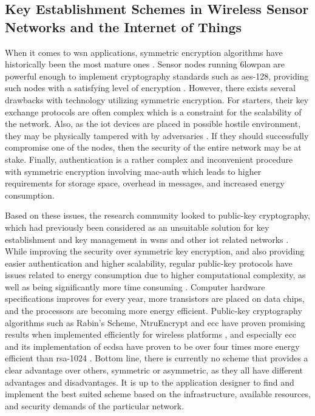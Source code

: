 

\subsection{Key Establishment Schemes in Wireless Sensor Networks and the Internet of Things}

When it comes to \gls{wsn} applications, symmetric encryption algorithms have historically been the most mature ones \citep{Jing2014}. Sensor nodes running \gls{6lowpan} are powerful enough to implement cryptography standards such as \gls{aes}-128, providing such nodes with a satisfying level of encryption \cite{Roman2011147}. However, there exists several drawbacks with technology utilizing symmetric encryption. For starters, their key exchange protocols are often complex which is a constraint for the scalability of the network. Also, as the \gls{iot} devices are placed in possible hostile environment, they may be physically tampered with by adversaries \cite{krentz20136lowpan}. If they should successfully compromise one of the nodes, then the security of the entire network may be at stake. Finally, authentication is a rather complex and inconvenient procedure with symmetric encryption involving \gls{mac-auth} which leads to higher requirements for storage space, overhead in messages, and increased energy consumption.

Based on these issues, the research community looked to public-key cryptography, which had previously been considered as an unsuitable solution for key establishment and key management in \gls{wsn}s and other \gls{iot} related networks \cite{gaubatz2004public, wander2005energy}. While improving the security over symmetric key encryption, and also providing easier authentication and higher scalability, regular public-key protocols have issues related to energy consumption due to higher computational complexity, as well as being significantly more time consuming \cite{Eschenauer2002}. Computer hardware specifications improves for every year, more transistors are placed on data chips, and the processors are becoming more energy efficient. Public-key cryptography algorithms such as Rabin's Scheme, NtruEncrypt and \gls{ecc} have proven promising results when implemented efficiently for wireless platforms \cite{Jing2014}, and especially \gls{ecc} and its implementation of \gls{ecdsa} have proven to be over four times more energy efficient than \gls{rsa}-1024 \cite{wander2005energy}. Bottom line, there is currently no scheme that provides a clear advantage over others, symmetric or asymmetric, as they all have different advantages and disadvantages. It is up to the application designer to find and implement the best suited scheme based on the infrastructure, available resources, and security demands of the particular network. 


